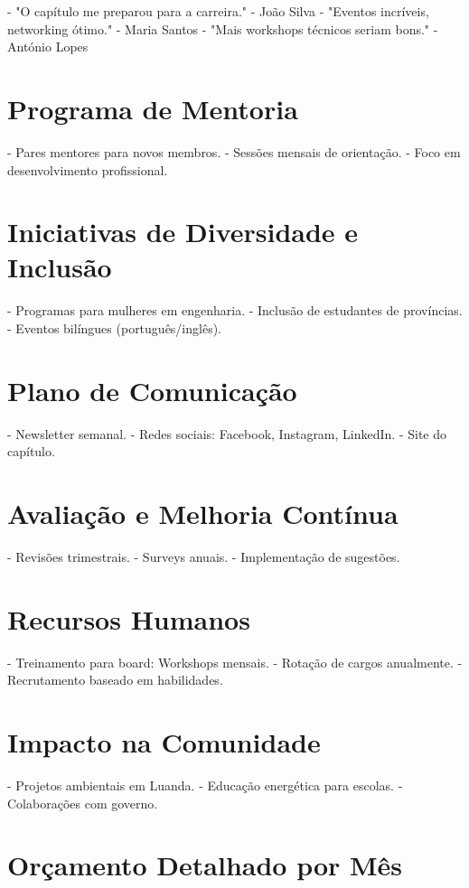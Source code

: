 \documentclass[12pt]{article}
\begin{document}
- "O capítulo me preparou para a carreira." - João Silva
- "Eventos incríveis, networking ótimo." - Maria Santos
- "Mais workshops técnicos seriam bons." - António Lopes

\section{Programa de Mentoria}

- Pares mentores para novos membros.
- Sessões mensais de orientação.
- Foco em desenvolvimento profissional.

\section{Iniciativas de Diversidade e Inclusão}

- Programas para mulheres em engenharia.
- Inclusão de estudantes de províncias.
- Eventos bilíngues (português/inglês).

\section{Plano de Comunicação}

- Newsletter semanal.
- Redes sociais: Facebook, Instagram, LinkedIn.
- Site do capítulo.

\section{Avaliação e Melhoria Contínua}

- Revisões trimestrais.
- Surveys anuais.
- Implementação de sugestões.

\section{Recursos Humanos}

- Treinamento para board: Workshops mensais.
- Rotação de cargos anualmente.
- Recrutamento baseado em habilidades.

\section{Impacto na Comunidade}

- Projetos ambientais em Luanda.
- Educação energética para escolas.
- Colaborações com governo.

\section{Orçamento Detalhado por Mês}
\end{document}
